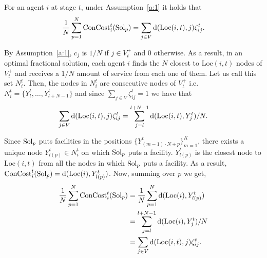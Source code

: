 \begin{lemma}\label{l:connection_cost}
 For an agent $i$ at stage $t$, under Assumption~\ref{a:1} it holds that
\[\frac{1}{N}\sum_{p=1}^N \mathrm{ConCost}^t_i(\mathrm{Sol}_p) =\sum_{j\in V} 
\mathrm{d}(\mathrm{Loc}(i,t),j)\zeta_{ij}^t
.\]
\end{lemma}
\begin{proof2} By Assumption~\ref{a:1}, $c_j$ is $1/N$ if $j \in V_t^+$ and $0$ 
otherwise. As a result, in an optimal fractional solution, each agent $i$ finds the 
$N$ closest to $\text{Loc}(i,t)$ nodes of $V_t^+$ and receives a $1/N$ amount 
of service from each one of them.
Let us call this set $N_i^t$. Then, the 
nodes in $N_i^t$ are consecutive nodes of $V_t^+$ i.e. $N_i^t = 
\{Y_l^t,\dots,Y_{l+N-1}^t\}$ and since $\sum_{j \in V}\zeta_{ij}^t = 1$ we have that
\[\sum\limits_{j\in V} \mathrm{d}(\text{Loc}(i,t),j)\zeta_{ij}^t =  \sum\limits_{j = l}^{l+N-1} 
\mathrm{d}(\text{Loc}(i,t),Y_j^t)/N.\]


\noindent Since $\mathrm{Sol}_p$ puts facilities in the positions $\{Y_{(m-1)\cdot N + 
p}^t\}_{m=1}^K$,
there exists a unique node $Y_{l(p)}^t \in N_i^t$ on which $\mathrm{Sol}_p$ puts a facility.
$Y_{l(p)}^t$ is the closest node to $\text{Loc}(i,t)$ from all the nodes in which 
$\mathrm{Sol}_p$ puts a facility.
As a result, $\mathrm{ConCost}_i^t(\mathrm{Sol}_p)= \mathrm{d}(\text{Loc}(i),Y_{l(p)}^t)$. Now, summing  
over $p$ we get,
\begin{align*}
\frac{1}{N}\sum\limits_{p=1}^N \mathrm{ConCost}_i^t(\mathrm{Sol}_p) &= 
\frac{1}{N}\sum\limits_{p=1}^N \mathrm{d}(\text{Loc}(i),Y_{l(p)}^t)\\
&= \sum\limits_{j=l}^{l+N-1} \mathrm{d}(\text{Loc}(i),Y_j^t)/N\\
&=\sum\limits_{j\in V} \mathrm{d}(\text{Loc}(i,t),j)\zeta_{ij}^t.
\end{align*}
\end{proof2}
\medskip

